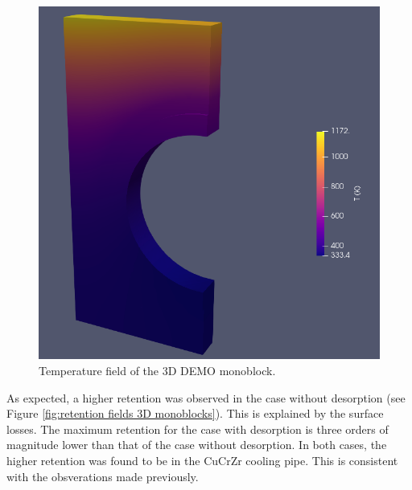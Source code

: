 \begin{figure} [h]
    \centering
    \includegraphics[width=\linewidth]{Figures/Chapter3/monoblocks/3D_monoblocks/temperature_3D_monoblock.png}
    \caption{Temperature field of the 3D DEMO monoblock.}
    \label{fig: T field 3D monoblock}
\end{figure}


As expected, a higher retention was observed in the case without desorption (see Figure \ref{fig:retention fields 3D monoblocks}).
This is explained by the surface losses.
The maximum retention for the case with desorption is three orders of magnitude lower than that of the case without desorption.
In both cases, the higher retention was found to be in the CuCrZr cooling pipe.
This is consistent with the obsverations made previously.

